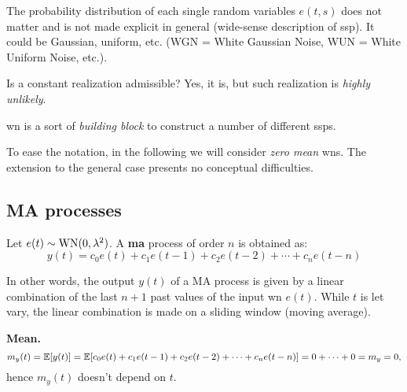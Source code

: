 \begin{figure}[htpb]
	\centering
\end{figure}
\FloatBarrier

\begin{rem}
The probability distribution of each single random variables $e(t,s)$ does not matter and is not made explicit in general (wide-sense description of \gls{ssp}).
It could be Gaussian, uniform, etc. (WGN = White Gaussian Noise, WUN = White Uniform Noise, etc.).
\end{rem}

\begin{rem}
Is a constant realization admissible? Yes, it is, but such realization is \emph{highly unlikely}.
\end{rem}
\gls{wn} is a sort of \emph{building block} to construct a number of different \glspl{ssp}.

To ease the notation, in the following we will consider \emph{zero mean} \glspl{wn}. The extension to the general case presents no conceptual difficulties.

\subsection{MA processes}

\begin{defn}
	Let $e(t) \sim \operatorname{WN}(0, \lambda^{2})$. A \textbf{\gls{ma}} process of order $n$ is obtained as:
	\[
		\boxed{y(t)=c_{0} e(t)+c_{1} e(t-1)+c_{2} e(t-2)+\cdots+c_{n} e(t-n)}
	\]
\end{defn}
In other words, the output $y(t)$ of a MA process is given by a linear combination of the last $n+1$ past values of the input \gls{wn} $e(t)$.
While $t$ is let vary, the linear combination is made on a sliding window (moving average).

\textbf{Mean.}
\[
	m_{y}(t)=\mathbb{E}[y(t)] = \mathbb{E}[c_{0} e(t)+c_{1} e(t-1)+c_{2} e(t-2)+\cdots+c_{n} e(t-n)] = 0+\cdots+0=m_{y}=0,
\]
hence $m_{y}(t)$ doesn't depend on $t$.

